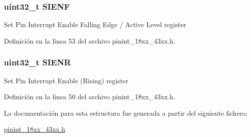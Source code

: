 \subsubsection[{\texorpdfstring{S\+I\+E\+NF}{SIENF}}]{ uint32\+\_\+t S\+I\+E\+NF}\hypertarget{struct_l_p_c___p_i_n___i_n_t___t_a41b168f6056decabbc18b9336337d1df}{}\label{struct_l_p_c___p_i_n___i_n_t___t_a41b168f6056decabbc18b9336337d1df}
Set Pin Interrupt Enable Falling Edge / Active Level register 

Definición en la línea 53 del archivo pinint\+\_\+18xx\+\_\+43xx.\+h.

\subsubsection[{\texorpdfstring{S\+I\+E\+NR}{SIENR}}]{ uint32\+\_\+t S\+I\+E\+NR}\hypertarget{struct_l_p_c___p_i_n___i_n_t___t_a46795e5ae5ba2c24b8d75c84b406a2d2}{}\label{struct_l_p_c___p_i_n___i_n_t___t_a46795e5ae5ba2c24b8d75c84b406a2d2}
Set Pin Interrupt Enable (Rising) register 

Definición en la línea 50 del archivo pinint\+\_\+18xx\+\_\+43xx.\+h.



La documentación para esta estructura fue generada a partir del siguiente fichero\+:\begin{DoxyCompactItemize}
\item 
\hyperlink{pinint__18xx__43xx_8h}{pinint\+\_\+18xx\+\_\+43xx.\+h}\end{DoxyCompactItemize}
